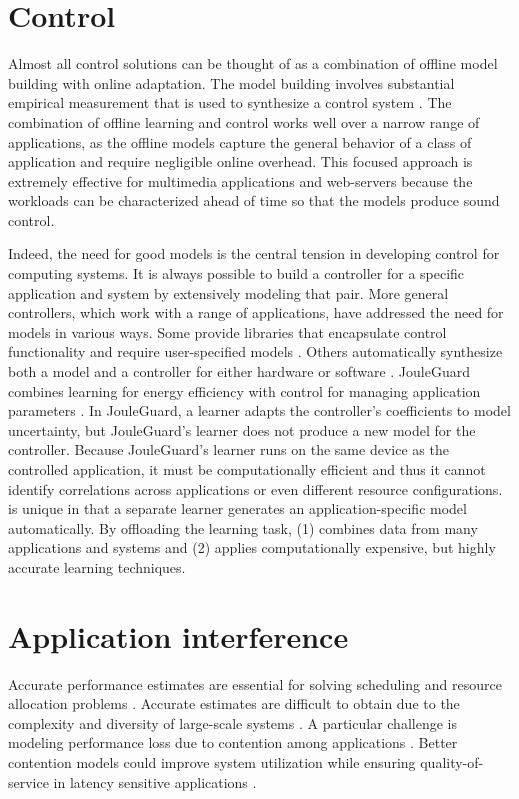 \section{Control}
Almost all control solutions can be thought of as a combination of
offline model building with online adaptation.  The model building
involves substantial empirical measurement that is used to synthesize
a control system
\cite{Wu2004,TCST,Chen2011,PTRADE,POET,ControlWare,Agilos,Rajkumar,Sojka,Raghavendra2008}.
The combination of offline learning and control works well over a
narrow range of applications, as the offline models capture the
general behavior of a class of application and require negligible
online overhead.  This focused approach is extremely effective for
multimedia applications \cite{grace2,flinn99,flinn2004,xtune,TCST} and
web-servers \cite{Horvarth,LuEtAl-2006a,SunDaiPan-2008a} because the
workloads can be characterized ahead of time so that the models
produce sound control.

Indeed, the need for good models is the central tension in developing
control for computing systems.  It is always possible to build a
controller for a specific application and system by extensively
modeling that pair.  More general controllers, which work with a range
of applications, have addressed the need for models in various ways.
Some provide libraries that encapsulate control functionality and
require user-specified models
\cite{ControlWare,Sojka,Rajkumar,POET,SWiFT}.  Others automatically
synthesize both a model and a controller for either hardware
\cite{josep-isca2016} or software \cite{ICSE2014,FSE2015}.  JouleGuard
combines learning for energy efficiency with control for managing
application parameters \cite{JouleGuard}.  In JouleGuard, a learner
adapts the controller's coefficients to model uncertainty, but
JouleGuard's learner does not produce a new model for the controller.
Because JouleGuard's learner runs on the same device as the controlled
application, it must be computationally efficient and thus it cannot
identify correlations across applications or even different resource
configurations.  \SYSTEM{} is unique in that a separate learner
generates an application-specific model automatically.  By offloading
the learning task, \SYSTEM{} (1) combines data from many applications
and systems and (2) applies computationally expensive, but highly
accurate learning techniques.


\section{Application interference}
Accurate performance estimates are essential for solving scheduling
and resource allocation problems \cite{chiang2002impact}.  Accurate
estimates are difficult to obtain due to the complexity and diversity
of large-scale systems \cite{kanev2015profiling}.  A particular
challenge is modeling performance loss due to contention among
applications \cite{kambadur2012measuring}.  Better contention models
could improve system utilization while ensuring quality-of-service in
latency sensitive applications \cite{Bubble-flux}.

